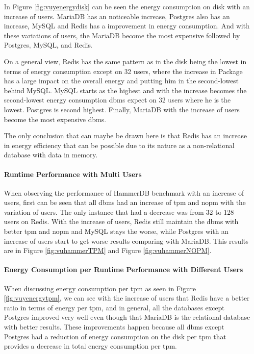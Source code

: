     In Figure \ref{fig:vuyenergydisk} can be seen the energy consumption on disk with an increase of users. MariaDB has an noticeable increase, Postgres also has an increase, MySQL and Redis has a improvement in energy consumption. And with these variations of users, the MariaDB become the most expensive followed by Postgres, MySQL, and Redis.
    
    On a general view, Redis has the same pattern as in the disk being the lowest in terms of energy consumption except on 32 users, where the increase in Package has a large impact on the overall energy and putting him in the second-lowest behind MySQL. MySQL  starts as the highest and with the increase becomes the second-lowest energy consumption \gls{dbms} expect on 32 users where he is the lowest. Postgres is second highest. Finally, MariaDB with the increase of users become the most expensive \gls{dbms}.
    
    The only conclusion that can maybe be drawn here is that Redis has an increase in energy efficiency that can be possible due to its nature as a non-relational database with data in memory.




\paragraph{Runtime Performance with Multi Users}

    When observing the performance of HammerDB benchmark with an increase of users, first can be seen that all \gls{dbms} had an increase of \gls{tpm} and \gls{nopm} with the variation of users. The only instance that had a decrease was from 32 to 128 users on Redis. With the increase of users, Redis still maintain the \gls{dbms} with better \gls{tpm} and \gls{nopm} and MySQL stays the worse, while Postgres with an increase of users start to get worse results comparing with MariaDB. This results are in Figure \ref{fig:vuhammerTPM} and Figure \ref{fig:vuhammerNOPM}.
    

    



\paragraph{Energy Consumption per Runtime Performance with Different Users}

    When discussing energy consumption per \gls{tpm} as seen in Figure \ref{fig:vuyenergytpm}, we can see with the increase of users that Redis have a better ratio in terms of energy per \gls{tpm}, and in general, all the databases except Postgres improved very well even though that MariaDB is the relational database with better results. These improvements happen because all \gls{dbms} except Postgres had a reduction of energy consumption on the disk per \gls{tpm} that provides a decrease in total energy consumption per \gls{tpm}. 
    
